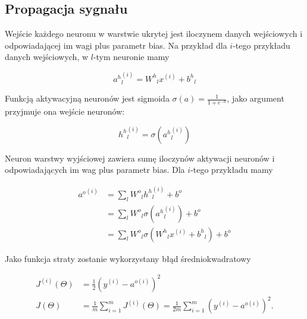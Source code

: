 \documentclass[]{article}
\theoremstyle{definition}
\begin{document}
\subsection{Propagacja sygnału}

Wejście każdego neuronu w warstwie ukrytej jest iloczynem danych wejściowych i odpowiadającej im wagi plus parametr bias. Na przykład dla $i$-tego przykładu danych wejściowych, w $l$-tym neuronie mamy

\begin{equation}
{a^h}^{(i)}_l = {W^h}_{l}x^{(i)} + {b^h}_l
\end{equation}




Funkcją aktywacyjną neuronów jest sigmoida $\sigma(a) = \frac{1}{1+e^{-a}}$, jako argument przyjmuje ona wejście neuronów:

\begin{equation}
{h^h}^{(i)}_l=\sigma({a^h}^{(i)}_l)
\end{equation}


Neuron warstwy wyjściowej zawiera sumę iloczynów aktywacji neuronów i odpowiadających im wag plus parametr bias. Dla $i$-tego przykładu mamy

\begin{equation}
\begin{split}
{a^o}^{(i)} &= \sum_{l} {W^o}_l{h^h}^{(i)}_l + {b^o} \\
& = \sum_{l} {W^o}_l\sigma({a^h}^{(i)}_l) + {b^o} \\
& = \sum_{l} {W^o}_l\sigma({W^h}_{l}x^{(i)} + {b^h}_l) + {b^o}
\end{split}
\end{equation}

Jako funkcja straty zostanie wykorzystany błąd średniokwadratowy

\begin{equation}
\begin{split}
J^{(i)}(\Theta) &= \frac{1}{2} \left( y^{(i)}- a^{o{(i)}}  \right)  ^2 \\
J(\Theta) &= \frac{1}{m}\sum_{i=1}^m J^{(i)}(\Theta)= \frac{1}{2m}\sum_{i=1}^m \left( y^{(i)}- a^{o{(i)}}  \right)  ^2  .
\end{split}
\end{equation}
\end{document}
